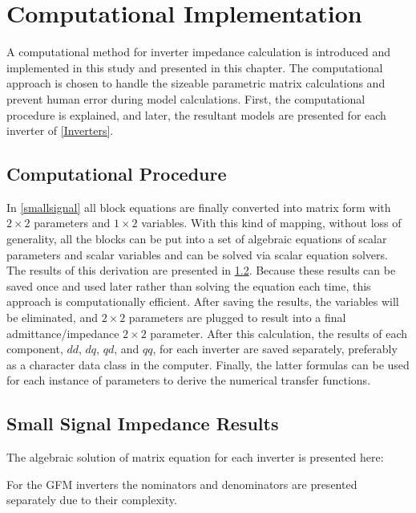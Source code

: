 
\chapter{Computational Implementation}\label{implementation}

A computational method for inverter impedance calculation is introduced and implemented in this study and presented in this chapter. The computational approach is chosen to handle the sizeable parametric matrix calculations and prevent human error during model calculations. First, the computational procedure is explained, and later, the resultant models are presented for each inverter of \ref{Inverters}.

\section{Computational Procedure}

In \ref{smallsignal} all block equations are finally converted into matrix form with $2 \times 2$ parameters and $1 \times 2$ variables. With this kind of mapping, without loss of generality, all the blocks can be put into a set of algebraic equations of scalar parameters and scalar variables and can be solved via scalar equation solvers. The results of this derivation are presented in \ref{formula}. Because these results can be saved once and used later rather than solving the equation each time, this approach is computationally efficient. After saving the results, the variables will be eliminated, and $2 \times 2$ parameters are plugged to result into a final admittance/impedance $2 \times 2$ parameter. After this calculation, the results of each component, $dd$, $dq$, $qd$, and $qq$, for each inverter are saved separately, preferably as a character data class in the computer. Finally, the latter formulas can be used for each instance of parameters to derive the numerical transfer functions.

\section{Small Signal Impedance Results}\label{formula}

The algebraic solution of matrix equation for each inverter is presented here:

For the \gls{GFM} inverters the nominators and denominators are presented separately due to their complexity.

